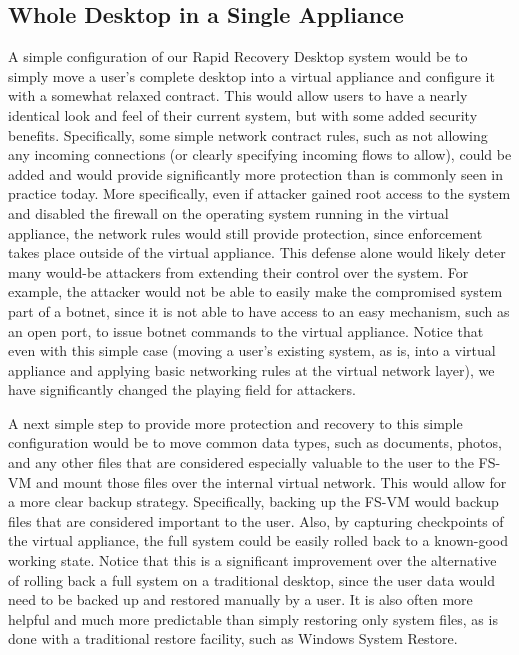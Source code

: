 \subsection{Whole Desktop in a Single Appliance}

A simple configuration of our Rapid Recovery Desktop system would be to simply move a user's complete desktop into a virtual appliance and configure it with a somewhat relaxed contract. This would allow users to have a nearly identical look and feel of their current system, but with some added security benefits. Specifically, some simple network contract rules, such as not allowing any incoming connections (or clearly specifying incoming flows to allow), could be added and would provide significantly more protection than is commonly seen in practice today. More specifically, even if attacker gained root access to the system and disabled the firewall on the operating system running in the virtual appliance, the network rules would still provide protection, since enforcement takes place outside of the virtual appliance. This defense alone would likely deter many would-be attackers from extending their control over the system. For example, the attacker would not be able to easily make the compromised system part of a botnet, since it is not able to have access to an easy mechanism, such as an open port, to issue botnet commands to the virtual appliance. Notice that even with this simple case (moving a user's existing system, as is, into a virtual appliance and applying basic networking rules at the virtual network layer), we have significantly changed the playing field for attackers.

A next simple step to provide more protection and recovery to this simple configuration would be to move common data types, such as documents, photos, and any other files that are considered especially valuable to the user to the FS-VM and mount those files over the internal virtual network. This would allow for a more clear backup strategy. Specifically, backing up the FS-VM would backup files that are considered important to the user. Also, by capturing checkpoints of the virtual appliance, the full system could be easily rolled back to a known-good working state. Notice that this is a significant improvement over the alternative of rolling back a full system on a traditional desktop, since the user data would need to be backed up and restored manually by a user. It is also often more helpful and much more predictable than simply restoring only system files, as is done with a traditional restore facility, such as Windows System Restore.

